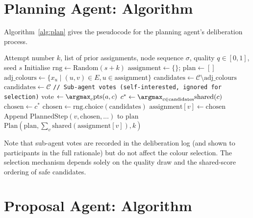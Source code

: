 \documentclass[11pt]{article}
\theoremstyle{definition}
\begin{document}
\section{Planning Agent: Algorithm}
\label{app:planning}

Algorithm~\ref{alg:plan} gives the pseudocode for the planning agent's deliberation
process.

\begin{algorithm}
\caption{PlanningAgent.generate\_plan($k$, prior\_attempts, node\_order)}
\label{alg:plan}
\begin{algorithmic}[1]
\REQUIRE Attempt number $k$, list of prior assignments, node sequence $\sigma$,
         quality $q \in [0,1]$, seed $s$
\STATE Initialise $\mathrm{rng} \gets \text{Random}(s + k)$
\STATE $\mathrm{assignment} \gets \{\}$; $\mathrm{plan} \gets []$
  \STATE $\mathrm{adj\_colours} \gets \{x_u \mid (u,v) \in E, u \in \mathrm{assignment}\}$
  \STATE $\mathrm{candidates} \gets \mathcal{C} \setminus \mathrm{adj\_colours}$
    \STATE $\mathrm{candidates} \gets \mathcal{C}$ 
  \ENDIF
  \STATE \texttt{// Sub-agent votes (self-interested, ignored for selection)}
    \STATE vote $\gets \argmax_{c} \text{pts}(a, c)$
  \ENDFOR
  \STATE $c^* \gets \argmax_{c \in \mathrm{candidates}} \text{shared}(c)$ 
    \STATE $\mathrm{chosen} \gets c^*$ 
  \ELSE
    \STATE $\mathrm{chosen} \gets \mathrm{rng.choice}(\mathrm{candidates})$ 
  \ENDIF
  \STATE $\mathrm{assignment}[v] \gets \mathrm{chosen}$
  \STATE Append $\mathrm{PlannedStep}(v, \mathrm{chosen}, \ldots)$ to $\mathrm{plan}$
\ENDFOR
\RETURN $\mathrm{Plan}(\mathrm{plan}, \sum_v \text{shared}(\mathrm{assignment}[v]), k)$
\end{algorithmic}
\end{algorithm}

Note that sub-agent votes are recorded in the deliberation log (and shown to participants
in the full rationale) but do not affect the colour selection.  The selection mechanism
depends solely on the quality draw and the shared-score ordering of safe candidates.

\section{Proposal Agent: Algorithm}
\label{app:proposal}
\end{document}

